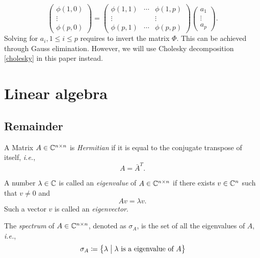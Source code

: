 \begin{equation}
	\begin{pmatrix} \phi(1,0)\\ \vdots \\ \phi(p,0) \end{pmatrix}=\begin{pmatrix} \phi(1,1) & \cdots & \phi(1,p) \\ \vdots & & \vdots \\ \phi(p,1) & \cdots & \phi(p,p) \end{pmatrix}\begin{pmatrix} a_1 \\ \vdots \\ a_p \end{pmatrix}.
\end{equation}
Solving for \(a_i, 1\leq i\leq p\) requires to invert the matrix $\Phi$.
This can be achieved through Gauss elimination.
However, we will use Cholesky decomposition \ref{cholesky} in this paper instead.


\section{Linear algebra}
\subsection{Remainder}

\begin{definition}
A Matrix \(A\in\mathbb{C}^{n\times n}\) is \emph{Hermitian} if it is equal to the conjugate transpose of itself, \textit{i.e.},
\begin{equation*}
A=\bar{A}^T.
\end{equation*}
\end{definition}


\begin{definition}
A number \(\lambda\in\mathbb{C}\) is called an \emph{eigenvalue} of \(A\in\mathbb{C}^{n\times n}\) if there exists \(v\in\mathbb{C}^n\) such that \(v\neq0\) and
\begin{equation*}
Av=\lambda v.
\end{equation*}
Such a vector $v$ is called an \emph{eigenvector}.
\end{definition}


\begin{definition}[Spectrum]
The \emph{spectrum} of \(A\in\mathbb{C}^{n\times n}\), denoted as \(\sigma_A\), is the set of all the eigenvalues of $A$, \textit{i.e.},
\begin{equation*}
\sigma_A\coloneqq\Set{\lambda}{\lambda \text{ is a eigenvalue of }A}
\end{equation*}
\end{definition}


